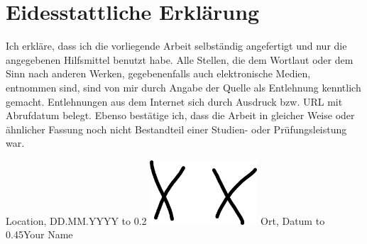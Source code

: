 \chapter*{Eidesstattliche Erklärung}

Ich erkläre, dass ich die vorliegende Arbeit selbständig angefertigt und nur die angegebenen Hilfsmittel
benutzt habe. Alle Stellen, die dem Wortlaut oder dem Sinn nach anderen Werken, gegebenenfalls
auch elektronische Medien, entnommen sind, sind von mir durch Angabe der Quelle als Entlehnung
kenntlich gemacht. Entlehnungen aus dem Internet sich durch Ausdruck bzw. URL mit Abrufdatum
belegt. Ebenso bestätige ich, dass die Arbeit in gleicher Weise oder ähnlicher Fassung noch nicht
Bestandteil einer Studien- oder Prüfungsleistung war.


Location, DD.MM.YYYY 
\hbox%
to 0.2\textwidth{}
\includegraphics[width=0.3\textwidth]{logos/signature.png}
\newline
Ort, Datum \noindent\hbox%
to 0.45\textwidth{}Your Name

